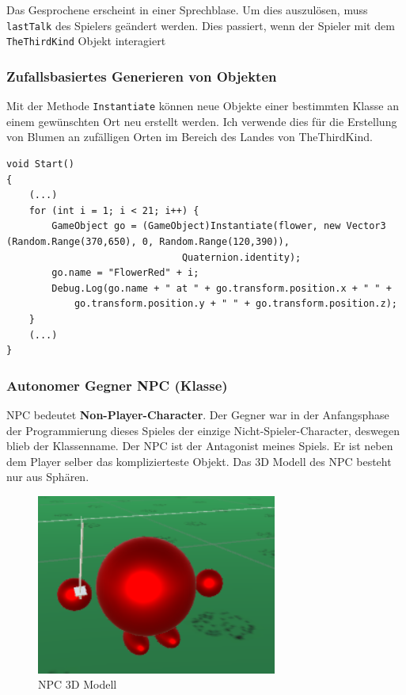 Das Gesprochene erscheint in einer Sprechblase. Um dies auszulösen, muss \lstinline{lastTalk} des Spielers geändert werden.
Dies passiert, wenn der Spieler mit dem \lstinline{TheThirdKind} Objekt interagiert 

\subsubsection{Zufallsbasiertes Generieren von Objekten}

Mit der Methode \lstinline{Instantiate} können neue Objekte einer bestimmten Klasse an einem gewünschten Ort neu erstellt werden. Ich verwende dies für die Erstellung von Blumen an zufälligen Orten im Bereich des Landes von TheThirdKind.
\begin{lstlisting}[caption={Generieren von Blumen beim Start (Player.cs)}]
void Start()
{
	(...)
	for (int i = 1; i < 21; i++) {
		GameObject go = (GameObject)Instantiate(flower, new Vector3 (Random.Range(370,650), 0, Random.Range(120,390)),
				               Quaternion.identity);
		go.name = "FlowerRed" + i;
		Debug.Log(go.name + " at " + go.transform.position.x + " " +
			go.transform.position.y + " " + go.transform.position.z);
	}
	(...)
}
\end{lstlisting}

\subsubsection{Autonomer Gegner NPC (Klasse)}
\label{subsubsec:npc}
NPC bedeutet \textbf{Non-Player-Character}. Der Gegner war in der Anfangsphase der Programmierung dieses Spieles der einzige Nicht-Spieler-Character, deswegen blieb der Klassenname. Der NPC ist der Antagonist meines Spiels.
Er ist neben dem Player selber das komplizierteste Objekt. Das 3D Modell des NPC besteht nur aus Sphären.

\begin{figure}[H]
\includegraphics[scale=1]{screenshots/npc.png}
\caption{NPC 3D Modell}
\end{figure}

